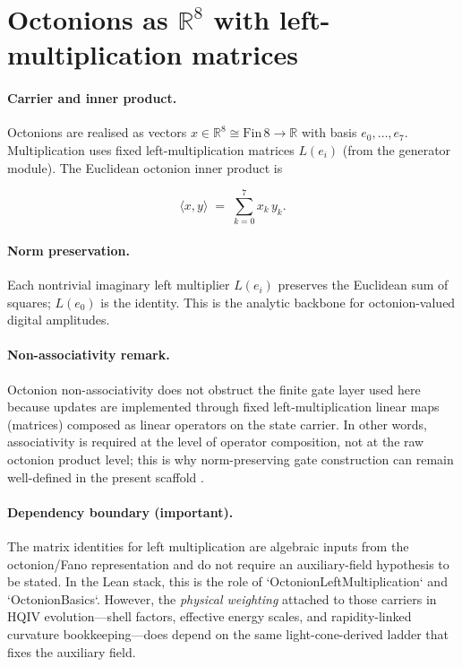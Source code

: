 \documentclass[11pt,a4paper]{article}
\theoremstyle{remark}
\begin{document}
\section{Octonions as \texorpdfstring{$\mathbb{R}^8$}{R8} with left-multiplication matrices}

\paragraph{Carrier and inner product.}
Octonions are realised as vectors $x\in\mathbb{R}^8\cong\mathrm{Fin}\,8\to\mathbb{R}$ with basis $e_0,\ldots,e_7$. Multiplication uses fixed left-multiplication matrices $L(e_i)$ (from the generator module). The Euclidean octonion inner product is

\begin{equation}
  \langle x,y\rangle \;=\; \sum_{k=0}^{7} x_k\,y_k.
\end{equation}

\paragraph{Norm preservation.}
Each nontrivial imaginary left multiplier $L(e_i)$ preserves the Euclidean sum of squares; $L(e_0)$ is the identity. This is the analytic backbone for octonion-valued digital amplitudes.

\paragraph{Non-associativity remark.}
Octonion non-associativity does not obstruct the finite gate layer used here because updates are implemented through fixed left-multiplication linear maps (matrices) composed as linear operators on the state carrier. In other words, associativity is required at the level of operator composition, not at the raw octonion product level; this is why norm-preserving gate construction can remain well-defined in the present scaffold \cite{baez2002octonions,freedman2019}.

\paragraph{Dependency boundary (important).}
The matrix identities for left multiplication are algebraic inputs from the octonion/Fano representation and do not require an auxiliary-field hypothesis to be stated. In the Lean stack, this is the role of `OctonionLeftMultiplication` and `OctonionBasics`. However, the \emph{physical weighting} attached to those carriers in HQIV evolution---shell factors, effective energy scales, and rapidity-linked curvature bookkeeping---does depend on the same light-cone-derived ladder that fixes the auxiliary field.
\end{document}
